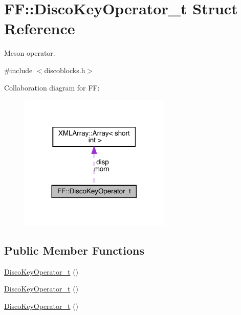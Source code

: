 \hypertarget{structFF_1_1DiscoKeyOperator__t}{}\section{FF\+:\+:Disco\+Key\+Operator\+\_\+t Struct Reference}
\label{structFF_1_1DiscoKeyOperator__t}


Meson operator.  




{\ttfamily \#include $<$discoblocks.\+h$>$}



Collaboration diagram for FF\+:\nopagebreak
\begin{figure}[H]
\begin{center}
\leavevmode
\includegraphics[width=204pt]{dc/d87/structFF_1_1DiscoKeyOperator__t__coll__graph}
\end{center}
\end{figure}
\subsection*{Public Member Functions}
\begin{DoxyCompactItemize}
\item 
\mbox{\hyperlink{structFF_1_1DiscoKeyOperator__t_ab4dabc722e586bb004065179dc9b4369}{Disco\+Key\+Operator\+\_\+t}} ()
\item 
\mbox{\hyperlink{structFF_1_1DiscoKeyOperator__t_ab4dabc722e586bb004065179dc9b4369}{Disco\+Key\+Operator\+\_\+t}} ()
\item 
\mbox{\hyperlink{structFF_1_1DiscoKeyOperator__t_ab4dabc722e586bb004065179dc9b4369}{Disco\+Key\+Operator\+\_\+t}} ()
\end{DoxyCompactItemize}
